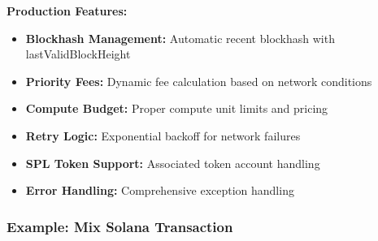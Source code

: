 \documentclass[11pt,a4paper]{article}
\begin{document}
\textbf{Production Features:}
\begin{itemize}
    \item \textbf{Blockhash Management:} Automatic recent blockhash with lastValidBlockHeight
    \item \textbf{Priority Fees:} Dynamic fee calculation based on network conditions
    \item \textbf{Compute Budget:} Proper compute unit limits and pricing
    \item \textbf{Retry Logic:} Exponential backoff for network failures
    \item \textbf{SPL Token Support:} Associated token account handling
    \item \textbf{Error Handling:} Comprehensive exception handling
\end{itemize}

\subsubsection{Example: Mix Solana Transaction}
\end{document}
